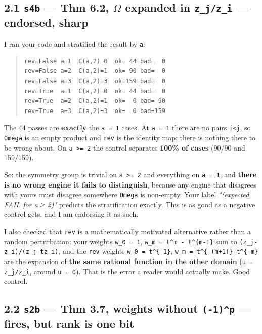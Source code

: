 \documentclass[11pt,a4paper]{article}
\begin{document}
\subsection*{2.1 \mbox{\texttt{s4b}} --- Thm 6.2, $\Omega$ expanded in \mbox{\texttt{z\_j/z\_i}} --- \textbf{endorsed, sharp}}

I ran your code and stratified the result by \mbox{\texttt{a}}:

\begin{quote}\footnotesize\begin{verbatim}
rev=False a=1  C(a,2)=0  ok= 44 bad=  0
rev=False a=2  C(a,2)=1  ok= 90 bad=  0
rev=False a=3  C(a,2)=3  ok=159 bad=  0
rev=True  a=1  C(a,2)=0  ok= 44 bad=  0
rev=True  a=2  C(a,2)=1  ok=  0 bad= 90
rev=True  a=3  C(a,2)=3  ok=  0 bad=159
\end{verbatim}\end{quote}

The 44 passes are \textbf{exactly} the \mbox{\texttt{a = 1}} cases. At \mbox{\texttt{a = 1}} there are no pairs \mbox{\texttt{i<j}}, so \mbox{\texttt{Omega}} is an empty product and \mbox{\texttt{rev}} is the identity map: there is nothing there to be wrong about. On \mbox{\texttt{a >= 2}} the control separates \textbf{100\% of cases} (90/90 and 159/159).

So: the symmetry group is trivial on \mbox{\texttt{a >= 2}} and everything on \mbox{\texttt{a = 1}}, and \textbf{there is no wrong engine it fails to distinguish}, because any engine that disagrees with yours must disagree somewhere \mbox{\texttt{Omega}} is non-empty. Your label \emph{"(expected FAIL for a$\geq$2)"} predicts the stratification exactly. This is as good as a negative control gets, and I am endorsing it as such.

I also checked that \mbox{\texttt{rev}} is a mathematically motivated alternative rather than a random perturbation: your weights \mbox{\texttt{w\_0 = 1}}, \mbox{\texttt{w\_m = t\textasciicircum{}m - t\textasciicircum{}\{m-1\}}} sum to \mbox{\texttt{(z\_j-z\_i)/(z\_j-tz\_i)}}, and the \mbox{\texttt{rev}} weights \mbox{\texttt{w\_0 = t\textasciicircum{}\{-1\}}}, \mbox{\texttt{w\_m = t\textasciicircum{}\{-(m+1)\}-t\textasciicircum{}\{-m\}}} are the expansion of \textbf{the same rational function in the other domain} (\mbox{\texttt{u = z\_j/z\_i}}, around \mbox{\texttt{u = 0}}). That is the error a reader would actually make. Good control.

\subsection*{2.2 \mbox{\texttt{s2b}} --- Thm 3.7, weights without \mbox{\texttt{(-1)\textasciicircum{}p}} --- \textbf{fires, but rank is one bit}}
\end{document}
